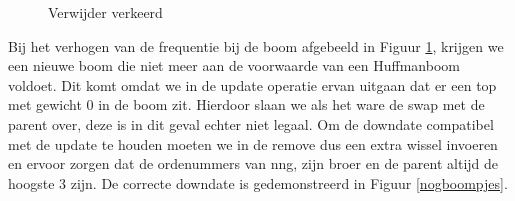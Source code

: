 \documentclass[twoside,twocolumn]{article}
\begin{document}
        
        \begin{figure}[H]
            \begin{center}
        \end{center}
        \caption{Verwijder verkeerd}
        \label{fig:verwijderverkeerd}
    \end{figure}
    
    Bij het verhogen van de frequentie bij de boom afgebeeld in Figuur \ref{fig:verwijderverkeerd}, krijgen we een nieuwe boom die niet meer aan de voorwaarde van een Huffmanboom voldoet. Dit komt omdat we in de update operatie ervan uitgaan dat er een top met gewicht 0 in de boom zit.
    Hierdoor slaan we als het ware de swap met de parent over, deze is in dit geval echter niet legaal.
    Om de downdate compatibel met de update te houden moeten we in de remove dus een extra wissel invoeren en ervoor zorgen dat de ordenummers van nng, zijn broer en de parent altijd de hoogste 3 zijn.
    De correcte downdate is gedemonstreerd in Figuur \ref{nogboompjes}. 
    
\end{document}
